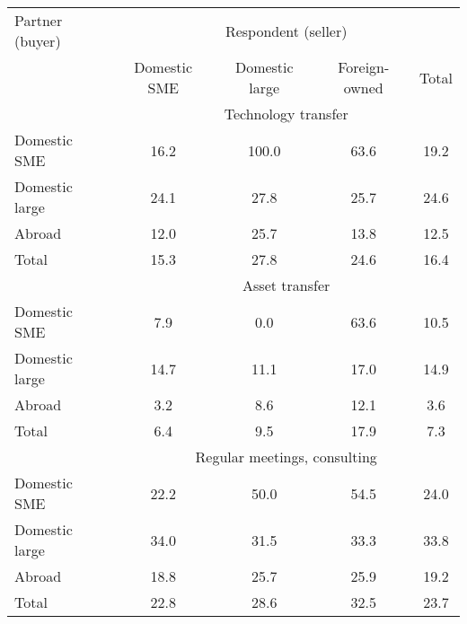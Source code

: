 
\begin{tabular}{lcccc} \hline
Partner (buyer) &	\multicolumn{4}{c}{Respondent (seller)}	\\		
	&Domestic SME	&Domestic large	&Foreign-owned	&Total\\
	\hline
	\hline
&\multicolumn{4}{c}{Technology transfer}\\
Domestic SME&	16.2&	100.0&	63.6&	19.2\\
Domestic large&	24.1&	27.8&	25.7&	24.6\\
Abroad&	12.0&	25.7&	13.8&	12.5\\
Total&	15.3&	27.8&	24.6&	16.4\\
\hline
&\multicolumn{4}{c}{Asset transfer}\\
Domestic SME&	7.9&	0.0&	63.6&	10.5\\
Domestic large&	14.7&	11.1&	17.0&	14.9\\
Abroad&	3.2&	8.6&	12.1&	3.6\\
Total&	6.4&	9.5&	17.9&	7.3\\
\hline
&\multicolumn{4}{c}{Regular meetings, consulting}\\
Domestic SME&	22.2&	50.0&	54.5&	24.0\\
Domestic large&	34.0&	31.5&	33.3&	33.8\\
Abroad&	18.8&	25.7&	25.9&	19.2\\
Total&	22.8&	28.6&	32.5&	23.7\\
\hline
\end{tabular}
